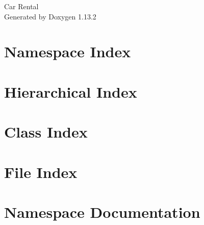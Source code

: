 \documentclass[twoside]{book}
\newcommand{\+}{\discretionary{\mbox{\scriptsize$\hookleftarrow$}}{}{}}
\newcommand{\clearemptydoublepage}{%
    \newpage{\pagestyle{empty}\cleardoublepage}%
  }
\begin{document}
  \raggedbottom
    \hypersetup{pageanchor=false,
                bookmarksnumbered=true,
                pdfencoding=unicode
               }
  \begin{titlepage}
  \vspace*{7cm}
  \begin{center}%
  {\Large Car Rental}\\
  \vspace*{1cm}
  {\large Generated by Doxygen 1.13.2}\\
  \end{center}
  \end{titlepage}
  \clearemptydoublepage
  \tableofcontents
  \clearemptydoublepage
  \hypersetup{pageanchor=true}

\chapter{Namespace Index}

\chapter{Hierarchical Index}

\chapter{Class Index}

\chapter{File Index}

\chapter{Namespace Documentation}









\end{document}
